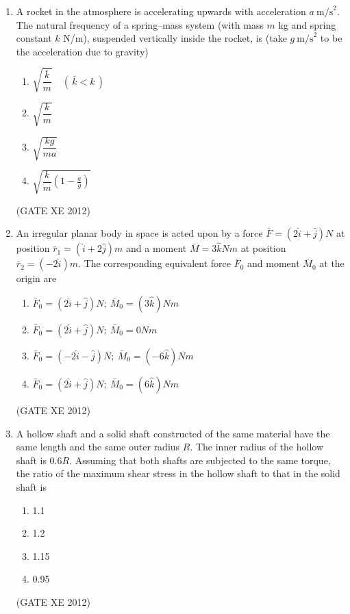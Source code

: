\documentclass[12pt]{article}
\begin{document}
\begin{enumerate}
\item A rocket in the atmosphere is accelerating upwards with acceleration $a~\text{m/s}^2$. The natural frequency of a spring–mass system (with mass $m$ kg and spring constant $k$ N/m), suspended vertically inside the rocket, is (take $g~\text{m/s}^2$ to be the acceleration due to gravity)  

\begin{multicols}{4}
\begin{enumerate}
    \item $\sqrt{\dfrac{\bar{k}}{m}} \quad (\,\bar{k} < k\,)$
    \item $\sqrt{\dfrac{k}{m}}$
    \item $\sqrt{\dfrac{kg}{ma}}$
    \item $\sqrt{\dfrac{k}{m}\left(1-\tfrac{a}{g}\right)}$
\end{enumerate}
\end{multicols}
(GATE XE 2012)

\item An irregular planar body in space is acted upon by a force $\bar{F} = (2\hat{i} + \hat{j})N$ at position 
$\bar{r}_1 = (\hat{i} + 2\hat{j})m$ and a moment $\bar{M} = 3\hat{k}Nm$ at position $\bar{r}_2 = (-2\hat{i})m$. 
The corresponding equivalent force $\bar{F}_0$ and moment $\bar{M}_0$ at the origin are  

\begin{enumerate}
    \item $\bar{F}_0 = (2\hat{i} + \hat{j})N;\ \bar{M}_0 = (3\hat{k})Nm$
    \item $\bar{F}_0 = (2\hat{i} + \hat{j})N;\ \bar{M}_0 = 0Nm$
    \item $\bar{F}_0 = (-2\hat{i} - \hat{j})N;\ \bar{M}_0 = (-6\hat{k})Nm$
    \item $\bar{F}_0 = (2\hat{i} + \hat{j})N;\ \bar{M}_0 = (6\hat{k})Nm$
\end{enumerate}
(GATE XE 2012)


\item A hollow shaft and a solid shaft constructed of the same material have the same length and the same outer radius $R$. The inner radius of the hollow shaft is $0.6R$. Assuming that both shafts are subjected to the same torque, the ratio of the maximum shear stress in the hollow shaft to that in the solid shaft is  

\begin{multicols}{4}
\begin{enumerate}
    \item 1.1
    \item 1.2
    \item 1.15
    \item 0.95
\end{enumerate}
\end{multicols}
(GATE XE 2012)



\end{enumerate}
\end{document}
